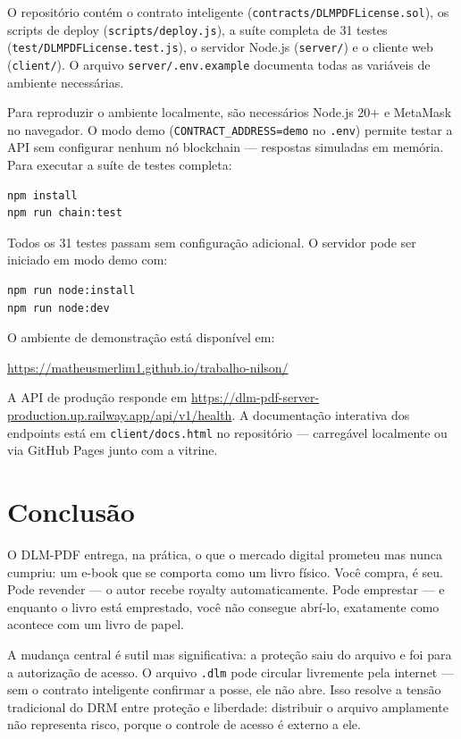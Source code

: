 \documentclass[12pt]{article}
\begin{document}
O repositório contém o contrato inteligente (\texttt{contracts/DLMPDFLicense.sol}), os scripts de deploy (\texttt{scripts/deploy.js}), a suíte completa de 31 testes (\texttt{test/DLMPDFLicense.test.js}), o servidor Node.js (\texttt{server/}) e o cliente web (\texttt{client/}). O arquivo \texttt{server/.env.example} documenta todas as variáveis de ambiente necessárias.

Para reproduzir o ambiente localmente, são necessários Node.js 20+ e MetaMask no navegador. O modo demo (\texttt{CONTRACT\_ADDRESS=demo} no \texttt{.env}) permite testar a API sem configurar nenhum nó blockchain — respostas simuladas em memória. Para executar a suíte de testes completa:

\begin{verbatim}
npm install
npm run chain:test
\end{verbatim}

Todos os 31 testes passam sem configuração adicional. O servidor pode ser iniciado em modo demo com:

\begin{verbatim}
npm run node:install
npm run node:dev
\end{verbatim}

O ambiente de demonstração está disponível em:

\begin{center}
\url{https://matheusmerlim1.github.io/trabalho-nilson/}
\end{center}

A API de produção responde em \url{https://dlm-pdf-server-production.up.railway.app/api/v1/health}. A documentação interativa dos endpoints está em \texttt{client/docs.html} no repositório — carregável localmente ou via GitHub Pages junto com a vitrine.

\section{Conclusão}

O DLM-PDF entrega, na prática, o que o mercado digital prometeu mas nunca cumpriu: um e-book que se comporta como um livro físico. Você compra, é seu. Pode revender — o autor recebe royalty automaticamente. Pode emprestar — e enquanto o livro está emprestado, você não consegue abrí-lo, exatamente como acontece com um livro de papel.

A mudança central é sutil mas significativa: a proteção saiu do arquivo e foi para a autorização de acesso. O arquivo \texttt{.dlm} pode circular livremente pela internet — sem o contrato inteligente confirmar a posse, ele não abre. Isso resolve a tensão tradicional do DRM entre proteção e liberdade: distribuir o arquivo amplamente não representa risco, porque o controle de acesso é externo a ele.
\end{document}
